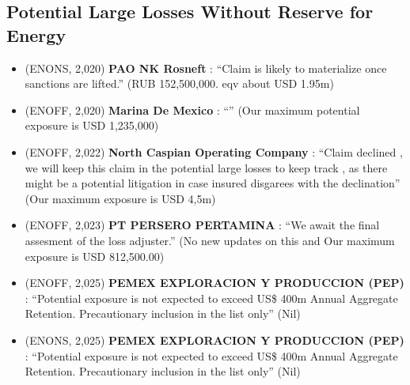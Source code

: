 
\subsection*{Potential Large Losses Without Reserve for Energy}

\begin{itemize}

  \item (ENONS, 2,020) \textbf{ PAO NK Rosneft }: ``Claim is likely to materialize once sanctions are lifted.'' (RUB 152,500,000. eqv about USD 1.95m)

  \item (ENOFF, 2,020) \textbf{ Marina De Mexico }: ``'' (Our maximum potential exposure is USD 1,235,000)

  \item (ENOFF, 2,022) \textbf{ North Caspian Operating Company }: ``Claim declined , we will keep this claim in the potential large losses to keep track , as there might be a potential litigation in case insured disgarees with the declination'' (Our maximum exposure is USD 4,5m)

  \item (ENOFF, 2,023) \textbf{ PT PERSERO PERTAMINA }: ``We await the final assesment of the loss adjuster.'' (No new updates on this and Our maximum exposure is USD 812,500.00)

  \item (ENOFF, 2,025) \textbf{ PEMEX EXPLORACION Y PRODUCCION (PEP) }: ``Potential exposure is not expected to exceed US\$ 400m Annual Aggregate Retention. Precautionary inclusion in the list only'' (Nil)

  \item (ENONS, 2,025) \textbf{ PEMEX EXPLORACION Y PRODUCCION (PEP) }: ``Potential exposure is not expected to exceed US\$ 400m Annual Aggregate Retention. Precautionary inclusion in the list only'' (Nil)

\end{itemize}